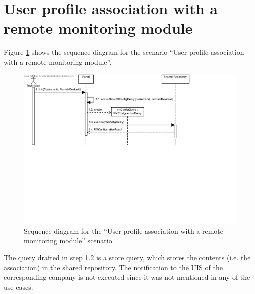 \section{User profile association with a remote monitoring module}

\npar Figure \ref{fig:scenario-5-2} shows the sequence diagram for the scenario
``User profile association with a remote monitoring module''.

\begin{figure}
	\begin{centering}
		\includegraphics[width=\textwidth]{figs/scenario-5-2.pdf}
		\caption{Sequence diagram for the ``User profile association with a remote
		monitoring module'' scenario}
		\label{fig:scenario-5-2}
	\end{centering}
\end{figure}

\npar The query drafted in step 1.2 is a store query, which stores the contents
(i.e. the association) in the shared repository. The notification to the UIS of
the corresponding company is not executed since it was not mentioned in any of
the use cases.
